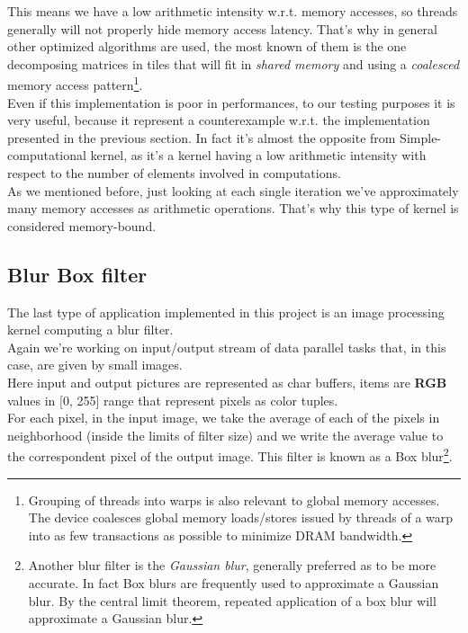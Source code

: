	This means we have a low arithmetic intensity w.r.t. memory accesses, so threads generally will not properly hide memory access latency.
	That's why in general other optimized algorithms are used, the most known of them is the one decomposing matrices in tiles that will fit in \textit{shared memory} and using a \textit{coalesced} memory access pattern\footnote{Grouping of threads into warps is also relevant to global memory accesses. The device coalesces global memory loads/stores issued by threads of a warp into as few transactions as possible to minimize DRAM bandwidth.}\cite{coalesced,cudabestpractices,cudaguide,matmul}.\\
	Even if this implementation is poor in performances, to our testing purposes it is very useful, because it represent a counterexample w.r.t. the implementation presented in the previous section.
	In fact it's almost the opposite from Simple-computational kernel, as it's a kernel having a low arithmetic intensity with respect to the number of elements involved in computations.\\
	As we mentioned before, just looking at each single iteration we've approximately many memory accesses as arithmetic operations.
	That's why this type of kernel is considered memory-bound.
	
	
\subsection{Blur Box filter}
	The last type of application implemented in this project is an image processing kernel computing a blur filter.\\
	Again we're working on input/output stream of data parallel tasks that, in this case, are given by small images.\\
	Here input and output pictures are represented as char buffers, items are \textbf{RGB} values in [0, 255] range that represent pixels as color tuples.\\
	For each pixel, in the input image, we take the average of each of the pixels in neighborhood (inside the limits of filter size) and we write the average value to the correspondent pixel of the output image. This filter is known as a Box blur\footnote{Another blur filter is the \textit{Gaussian blur}, generally preferred as to be more accurate. In fact Box blurs are frequently used to approximate a Gaussian blur. By the central limit theorem, repeated application of a box blur will approximate a Gaussian blur.}\cite{blurbox}.
	
